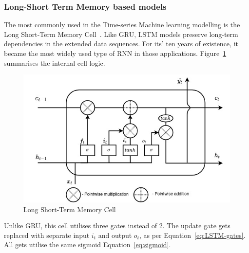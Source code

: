 %
\subsubsection{Long-Short Term Memory based models} \label{subsub:lstm}
The most commonly used in the Time-series Machine learning modelling is the Long Short-Term Memory Cell~\cite{LSTM_Hochreiter1997}.
Like GRU, LSTM models preserve long-term dependencies in the extended data sequences.
For its' ten years of existence, it became the most widely used type of RNN in those applications.
\mbox{Figure~\ref{fig:LSTM-cell}} summarises the internal cell logic.
\begin{figure}[ht]%
    \centering
    \includegraphics[width=\linewidth]{II_Body/LSTM/images/LSTM.jpg}
    \caption{Long Short-Term Memory Cell}
    \label{fig:LSTM-cell}
\end{figure}
Unlike GRU, this cell utilises three gates instead of 2.
The update gate gets replaced with separate input $i_t$ and output $o_t$, as per \mbox{Equation~\ref{eq:LSTM-gates}}.
All gets utilise the same sigmoid \mbox{Equation~\ref{eq:sigmoid}}.
